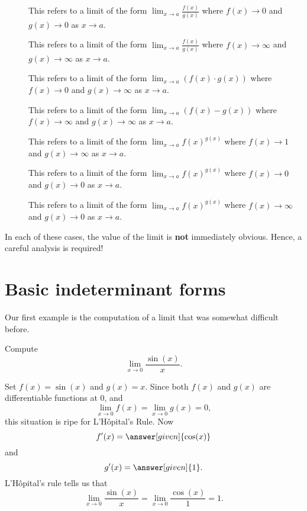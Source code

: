\documentclass{ximera}
\begin{document}
\begin{definition}\hfil
	\begin{description}
		\item[\zeroOverZero] This refers to a limit of the form $\lim_{x\to a}
		  \frac{f(x)}{g(x)}$ where $f(x)\to 0$ and $g(x)\to 0$ as $x\to a$.
		\item[\inftyOverInfty] This refers to a limit of the form $\lim_{x\to a}
		  \frac{f(x)}{g(x)}$ where $f(x)\to \infty$ and $g(x)\to \infty$ as $x\to a$.
		\item[\zeroTimesInfty] This refers to a limit of the form $\lim_{x\to a}
		  \left(f(x)\cdot g(x)\right)$ where $f(x)\to 0$ and $g(x)\to \infty$ as $x\to a$.
		\item[\inftyMinusInfty] This refers to a limit of the form $\lim_{x\to a}\left(
		  f(x)-g(x)\right)$ where $f(x)\to \infty$ and $g(x)\to \infty$ as $x\to a$.
		\item[\oneToInfty] This refers to a limit of the form $\lim_{x\to a}
		  f(x)^{g(x)}$ where $f(x)\to 1$ and $g(x)\to \infty$ as $x\to a$.
		\item[\zeroToZero] This refers to a limit of the form $\lim_{x\to a}
		  f(x)^{g(x)}$ where $f(x)\to 0$ and $g(x)\to 0$ as $x\to a$.
		\item[\inftyToZero] This refers to a limit of the form $\lim_{x\to a}
		  f(x)^{g(x)}$ where $f(x)\to \infty$ and $g(x)\to 0$ as $x\to a$.
	\end{description}
	In each of these cases, the value of the limit is \textbf{not} immediately
	obvious. Hence, a careful analysis is required!
\end{definition}

\section{Basic indeterminant forms}


Our first example is the computation of a limit that was somewhat
difficult before.

\begin{example}
	Compute
	\[ \lim_{x\to 0} \frac{\sin(x)}{x}. \]
	\begin{explanation}
		Set $f(x) = \sin(x)$ and $g(x) = x$.  Since both $f(x)$ and $g(x)$ are
		differentiable functions at $0$, and 
		\[
		\lim_{x \to 0} f(x) = \lim_{x \to 0}g(x) = 0,
		\]
		this situation is ripe for L'H\^{o}pital's Rule. Now
		\[
		f'(x) = \answer[given]{\cos(x)}
		\]
		and
		\[
		g'(x) = \answer[given]{1}.
		\] 
		L'H\^{o}pital's rule tells us that 
		\[ \lim_{x \to 0} \frac{\sin(x)}{x} = \lim_{x \to 0} \frac{\cos(x)}{1} = 1. \]
	\end{explanation}
\end{example}
\end{document}
